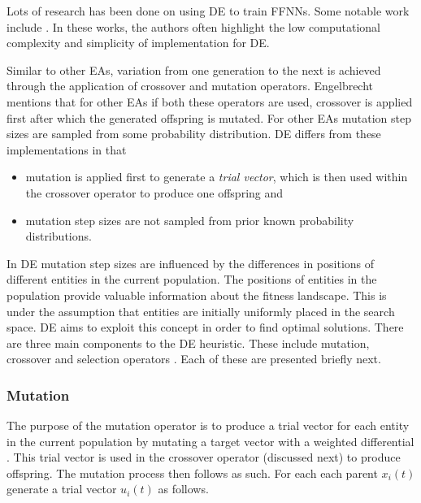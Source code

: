 Lots of research has been done on using \ac{DE} to train \acp{FFNN}. Some notable work include \cite{ref:ilonen:2003}\cite{ref:slowik:2008}\cite{ref:mingguang:2009}. In these works, the authors often highlight the low computational complexity and simplicity of implementation for \ac{DE}.

Similar to other \acp{EA}, variation from one generation to the next is achieved through the application of crossover and mutation operators. Engelbrecht \cite{ref:engelbrecht:2007} mentions that for other \acp{EA} if both these operators are used, crossover is applied first after which the generated offspring is mutated. For other \acp{EA} mutation step sizes are sampled from some probability distribution. \ac{DE} differs from these implementations in that

\begin{itemize}
      \item mutation is applied first to generate a \textit{trial vector}, which is then used within the crossover operator to produce one offspring and
      \item mutation step sizes are not sampled from prior known probability distributions.
\end{itemize}

In \ac{DE} mutation step sizes are influenced by the differences in positions of different entities in the current population. The positions of entities in the population provide valuable information about the fitness landscape. This is under the assumption that entities are initially uniformly placed in the search space. \ac{DE} aims to exploit this concept in order to find optimal solutions. There are three main components to the \ac{DE} heuristic. These include mutation, crossover and selection operators \cite{ref:price:2006}. Each of these are presented briefly next.

\subsubsection{Mutation}
\label{sec:heuristics:mh:de:mutation}

The purpose of the mutation operator is to produce a trial vector for each entity in the current population by mutating a target vector with a weighted differential \cite{ref:engelbrecht:2007}. This trial vector is used in the crossover operator (discussed next) to produce offspring. The mutation process then follows as such. For each each parent $x_{i}(t)$ generate a trial vector $u_{i}(t)$ as follows.

